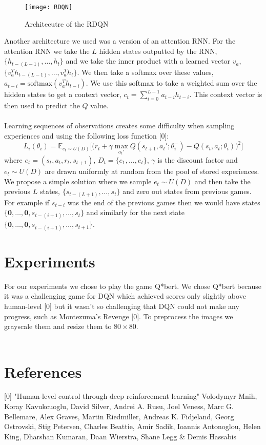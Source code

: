 \documentclass{article}
\begin{document}
\begin{figure}[h]
    \centering
    \texttt{[image: RDQN]}
    \caption{Architecutre of the RDQN}
\end{figure}

Another architecture we used was a version of an attention RNN. For the attention
RNN we take the $L$ hidden states outputted by the RNN, $\{h_{t-(L-1)}, \dots, h_{t}\}$
and we take the inner product with a learned vector $v_a$, $\{v_a^Th_{t-(L-1)}, \dots,
v_a^Th_{t}\}$. We then take a softmax over these values, $a_{t-i} =
\text{softmax}(v_a^Th_{t-i})$. We use this softmax to take a weighted sum over
the hidden states to get a context vector, $c_t = \sum_{i=0}^{L-1}a_{t-i}h_{t-i}$.
This context vector is then used to predict the $Q$ value. \\
\\
Learning sequences of observations creates some difficulty when sampling experiences
and using the following loss function [0]:
$$L_i(\theta_i) = \mathbb{E}_{e_t \sim U(D)}
\Big[\Big(
r_t + \gamma \max_{a_t'}Q(s_{t+1}, a_t'; \theta_i^-) -Q(s_t, a_t; \theta_i)
\Big)^2 \Big]$$
where $e_t = (s_t, a_t, r_t, s_{t+1})$, $D_t = \{e_1, \dots, e_t\}$, $\gamma$
is the discount factor and $e_t \sim U(D)$ are drawn uniformly at random from the
pool of stored experiences. We propose a simple solution where we sample $e_t
\sim U(D)$ and then take the previous $L$ states, $\{s_{t-(L+1)}, \dots, s_t\}$
and zero out states from previous games. For example if $s_{t-i}$ was the end of
the previous games then we would have states $\{\mathbf{0}, \dots, \mathbf{0},
s_{t-(i+1)}, \dots, s_t\}$ and similarly for the next state $\{\mathbf{0}, \dots,
\mathbf{0},s_{t-(i+1)}, \dots, s_{t+1}\}$. 
\section{Experiments}
For our experiments we chose to play the game Q*bert. We chose Q*bert because it
was a challenging game for DQN which achieved scores only slightly above human-level
[0] but it wasn't so challenging that DQN could not make any progress, such as
Montezuma's Revenge [0]. To preprocess the images we grayscale them and resize
them to $80\times 80$. \\
\\

\section*{References}
\small
[0] "Human-level control through deep reinforcement learning" Volodymyr Mnih, Koray Kavukcuoglu, David Silver, Andrei A. Rusu, Joel Veness, Marc G. Bellemare, Alex Graves, Martin Riedmiller, Andreas K. Fidjeland, Georg Ostrovski, Stig Petersen, Charles Beattie, Amir Sadik, Ioannis Antonoglou, Helen King, Dharshan Kumaran, Daan Wierstra, Shane Legg \& Demis Hassabis \\
\end{document}

